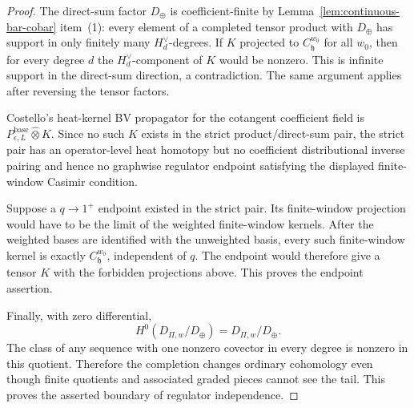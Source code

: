 \begin{proof}
  The direct-sum factor \(D_{\oplus}\) is coefficient-finite by
  Lemma~\ref{lem:continuous-bar-cobar} item~(1): every element of a
  completed tensor product with \(D_{\oplus}\) has support in only
  finitely many \(H_d^\vee\)-degrees.  If \(K\) projected to
  \(C^{w_0}_{\mathfrak h}\) for all \(w_0\), then for every degree
  \(d\) the \(H_d^\vee\)-component of \(K\) would be nonzero.  This is
  infinite support in the direct-sum direction, a contradiction.  The
  same argument applies after reversing the tensor factors.

  Costello's heat-kernel BV propagator for the cotangent coefficient
  field is \(P_{\epsilon,L}^{\mathrm{base}}\widehat\otimes K\).  Since
  no such \(K\) exists in the strict product/direct-sum pair, the
  strict pair has an operator-level heat homotopy but no coefficient
  distributional inverse pairing and hence no graphwise regulator
  endpoint satisfying the displayed finite-window Casimir condition.

  Suppose a \(q\to1^+\) endpoint existed in the strict pair.  Its
  finite-window projection would have to be the limit of the weighted
  finite-window kernels.  After the weighted bases are identified with
  the unweighted basis, every such finite-window kernel is exactly
  \(C^{w_0}_{\mathfrak h}\), independent of \(q\).  The endpoint would
  therefore give a tensor \(K\) with the forbidden projections above.
  This proves the endpoint assertion.

  Finally, with zero differential,
  \[
    H^0(D_{\Pi,w}/D_{\oplus})=D_{\Pi,w}/D_{\oplus}.
  \]
  The class of any sequence with one nonzero covector in every degree
  is nonzero in this quotient.  Therefore the completion changes
  ordinary cohomology even though finite quotients and associated
  graded pieces cannot see the tail.  This proves the asserted
  boundary of regulator independence.
\end{proof}

